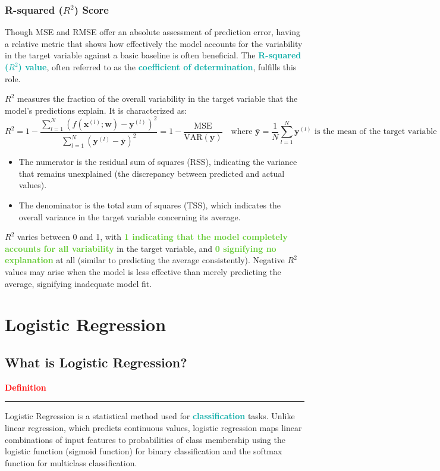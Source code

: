 \documentclass[twoside]{article}
\newcommand{\definition}[1]{\begin{definitionbox} \textcolor{red}{{\scriptsize\faStar} \textbf{Definition}} \newline \rule{\textwidth}{0.5pt}  \newline #1 \end{definitionbox}}
\newcommand{\highlightbluetext}[1]{\textcolor[HTML]{09ACA6}{\textbf{#1}}}
\newcommand{\highlightgreentext}[1]{\textcolor[HTML]{62C92F}{\textbf{#1}}}
\numberwithin{equation}{section}
\begin{document}
	\subsubsection{R-squared ($R^2$) Score}
	\label{subsubsec:RSquaredScore}
	Though MSE and RMSE offer an absolute assessment of prediction error, having a relative metric that shows how effectively the model accounts for the variability in the target variable against a basic baseline is often beneficial. The \highlightbluetext{R-squared ($R^2$) value}, often referred to as the \highlightbluetext{coefficient of determination}, fulfills this role.

	$R^2$ measures the fraction of the overall variability in the target variable that the model's predictions explain. It is characterized as:
	\begin{equation}
	\label{eq:RSquaredScoreDefinition}
		\boxed{R^2 = 1 - \frac{\sum_{l = 1}^{N} \left( f(\mathbf{x}^{(l)}; \mathbf{w}) - \mathbf{y}^{(l)} \right)^2}{\sum_{l = 1}^{N} \left( \mathbf{y}^{(l)} - \bar{\mathbf{y}} \right)^2} = 1 - \frac{\text{MSE}}{\text{VAR}(\mathbf{y})}} \quad \text{where } \bar{\mathbf{y}} = \frac{1}{N} \sum_{l = 1}^{N} \mathbf{y}^{(l)} \text{ is the mean of the target variable}
	\end{equation}
	\begin{itemize}
		\item The numerator is the residual sum of squares (RSS), indicating the variance that remains unexplained (the discrepancy between predicted and actual values).
		\item The denominator is the total sum of squares (TSS), which indicates the overall variance in the target variable concerning its average.
	\end{itemize}
	$R^2$ varies between 0 and 1, with \highlightgreentext{1 indicating that the model completely accounts for all variability} in the target variable, and \highlightgreentext{0 signifying no explanation} at all (similar to predicting the average consistently). Negative $R^2$ values may arise when the model is less effective than merely predicting the average, signifying inadequate model fit.

	\newpage
	\section{Logistic Regression}
	\label{sec:LogisticRegression}

	\subsection{What is Logistic Regression?}
	\label{subsec:WhatIsLogisticRegression}
	\definition{Logistic Regression is a statistical method used for \highlightbluetext{classification} tasks. Unlike linear regression, which predicts continuous values, logistic regression maps linear combinations of input features to probabilities of class membership using the logistic function (sigmoid function) for binary classification and the softmax function for multiclass classification.}
	
\end{document}
